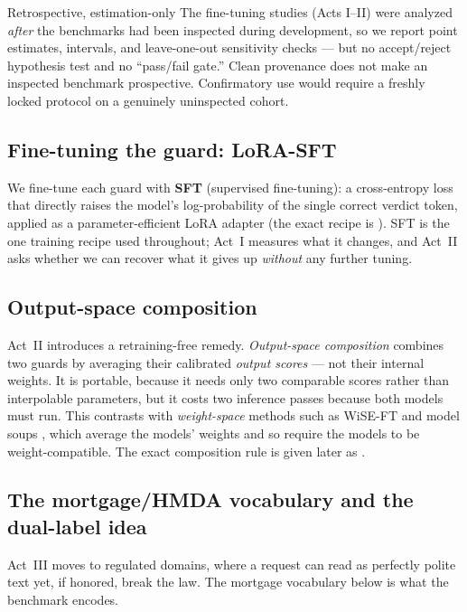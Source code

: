 \begin{takeaway}{Retrospective, estimation-only}
The fine-tuning studies (Acts I--II) were analyzed \emph{after} the benchmarks had been inspected
during development, so we report point estimates, intervals, and leave-one-out sensitivity checks ---
but no accept/reject hypothesis test and no ``pass/fail gate.'' Clean provenance does not make an
inspected benchmark prospective. Confirmatory use would require a freshly locked protocol on a
genuinely uninspected cohort.
\end{takeaway}

\subsection{Fine-tuning the guard: LoRA-SFT}
\label{sec:bg-objectives}

We fine-tune each guard with \textbf{SFT} (supervised fine-tuning): a cross-entropy loss that directly
raises the model's log-probability of the single correct verdict token, applied as a parameter-efficient
LoRA adapter (the exact recipe is ). SFT is the one training recipe used throughout;
Act~I measures what it changes, and Act~II asks whether we can recover what it gives up \emph{without}
any further tuning.

\subsection{Output-space composition}
\label{sec:bg-composition}

Act~II introduces a retraining-free remedy. \emph{Output-space composition} combines two guards by
averaging their calibrated \emph{output scores} --- not their internal weights. It is portable, because
it needs only two comparable scores rather than interpolable parameters, but it costs two inference
passes because both models must run. This contrasts with \emph{weight-space} methods such as WiSE-FT and
model soups \citep{wortsman2022wiseft,wortsman2022modelsoups}, which average the models' weights and so
require the models to be weight-compatible. The exact composition rule is given later as
.

\subsection{The mortgage/HMDA vocabulary and the dual-label idea}
\label{sec:bg-mortgage}

Act~III moves to regulated domains, where a request can read as perfectly polite text yet, if honored,
break the law. The mortgage vocabulary below is what the benchmark encodes.

